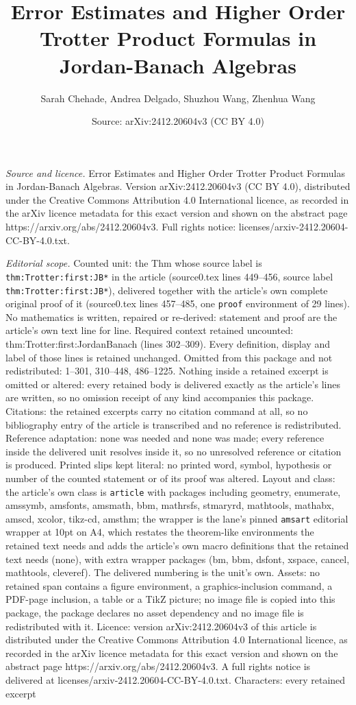 \documentclass[10pt,a4paper]{amsart}
\title[Error Estimates and Higher Order Trotter Product Formulas in]{Error Estimates and Higher Order Trotter Product Formulas in Jordan-Banach Algebras}
\author{Sarah Chehade, Andrea Delgado, Shuzhou Wang, Zhenhua Wang}
\date{Source: arXiv:2412.20604v3 (CC BY 4.0)}
\begin{document}
\maketitle

\noindent\emph{Source and licence.} Error Estimates and Higher Order Trotter Product Formulas in Jordan-Banach Algebras. Version arXiv:2412.20604v3 (CC BY 4.0), distributed under the Creative Commons Attribution 4.0 International licence, as recorded in the arXiv licence metadata for this exact version and shown on the abstract page https://arxiv.org/abs/2412.20604v3. Full rights notice: licenses/arxiv-2412.20604-CC-BY-4.0.txt.\par\smallskip

\noindent\textit{Editorial scope.} Counted unit: the Thm whose source label is \texttt{thm:Trotter:first:JB*} in the article (source0.tex lines 449--456, source label \texttt{thm:Trotter:first:JB*}), delivered together with the article's own complete original proof of it (source0.tex lines 457--485, one \texttt{proof} environment of 29 lines). No mathematics is written, repaired or re-derived: statement and proof are the article's own text line for line. Required context retained uncounted: thm:Trotter:first:JordanBanach (lines 302--309). Every definition, display and label of those lines is retained unchanged. Omitted from this package and not redistributed: 1--301, 310--448, 486--1225. Nothing inside a retained excerpt is omitted or altered: every retained body is delivered exactly as the article's lines are written, so no omission receipt of any kind accompanies this package. Citations: the retained excerpts carry no citation command at all, so no bibliography entry of the article is transcribed and no reference is redistributed. Reference adaptation: none was needed and none was made; every reference inside the delivered unit resolves inside it, so no unresolved reference or citation is produced. Printed slips kept literal: no printed word, symbol, hypothesis or number of the counted statement or of its proof was altered. Layout and class: the article's own class is \texttt{article} with packages including geometry, enumerate, amssymb, amsfonts, amsmath, bbm, mathrsfs, stmaryrd, mathtools, mathabx, amscd, xcolor, tikz-cd, amsthm; the wrapper is the lane's pinned \texttt{amsart} editorial wrapper at 10pt on A4, which restates the theorem-like environments the retained text needs and adds the article's own macro definitions that the retained text needs (none), with extra wrapper packages (bm, bbm, dsfont, xspace, cancel, mathtools, cleveref). The delivered numbering is the unit's own. Assets: no retained span contains a figure environment, a graphics-inclusion command, a PDF-page inclusion, a table or a TikZ picture; no image file is copied into this package, the package declares no asset dependency and no image file is redistributed with it. Licence: version arXiv:2412.20604v3 of this article is distributed under the Creative Commons Attribution 4.0 International licence, as recorded in the arXiv licence metadata for this exact version and shown on the abstract page https://arxiv.org/abs/2412.20604v3. A full rights notice is delivered at licenses/arxiv-2412.20604-CC-BY-4.0.txt. Characters: every retained excerpt 
\end{document}
